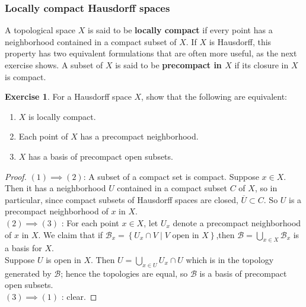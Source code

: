 \documentclass[reqno]{amsart}
\theoremstyle{plain}%
\theoremstyle{definition}
\newtheorem{exercise}[theorem]{Exercise}
\theoremstyle{remark}
\begin{document}
    \subsubsection*{Locally compact Hausdorff spaces}
        A topological space $X$ is said to be \textbf{locally compact} if every point
        has a neighborhood contained in a compact subset of $X$. If
        $X$ is Hausdorff, this property has two equivalent formulations that are often
        more useful, as the next exercise shows.
        A subset of $X$ is said to be \textbf{precompact in $X$} if its closure in
        $X$ is compact.
        \begin{exercise}\label{locally-compact-equiv-open-precompact-basis}
            For a Hausdorff space $X$, show that the following are
        equivalent:\\
        \begin{enumerate}
            \item $X$ is locally compact.
            \item Each point of $X$ has a precompact neighborhood.
            \item $X$ has a basis of precompact open subsets.
        \end{enumerate}
        \end{exercise} 
        \begin{proof}
            $(1) \implies (2)$: A subset of a compact set is compact.
        Suppose
        $x \in X$. Then it has a neighborhood $U$ contained in a compact subset
        $C$ of $X$, so in particular, since compact subsets of Hausdorff spaces are
        closed, $\overline{U} \subset C$. So $U$ is a precompact neighborhood of
        $x$ in $X$.\\
        \linebreak
        $\left( 2 \right) \implies (3)$ : For each point $x \in X$, let
        $U_x$ denote a precompact neighborhood of $x$ in $X$. We claim
         that if $\mathcal{B}_x = \left\{ U_x \cap V  \mid 
         V \text{ open in }X \right\} $,then
         $\mathcal{B}=\bigcup_{x \in X} \mathcal{B}_x$ is a basis for $X$.\\
         Suppose $U$ is open in $X$. Then
         $U = \bigcup_{x \in U} U_x \cap U$ which is in the topology generated by
         $\mathcal{B}$; hence the topologies are equal, so
         $\mathcal{B}$ is a basis of precompact open subsets.\\
         \linebreak
         $(3) \implies (1)$ : clear.
        \end{proof}
\end{document}

